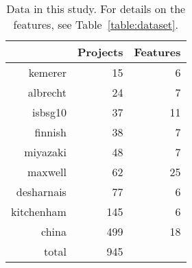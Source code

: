 \begin{table}[t!]
\caption{Data   in this study. For details on the features, see Table~\ref{table:dataset}.}\label{table:dataset_c}
\centering
\begin{tabular}{r|rr}
 	&Projects&	Features\\\hline
kemerer	&15&	6\\
albrecht&	24&	7\\
isbsg10&    37& 11\\
finnish	&38&	7\\
miyazaki&	48&	7\\
maxwell&	62	&25\\
desharnais&	77&	6\\
kitchenham& 145&    6\\
china&  499&    18\\\hline
total & 945
\end{tabular}
\end{table}